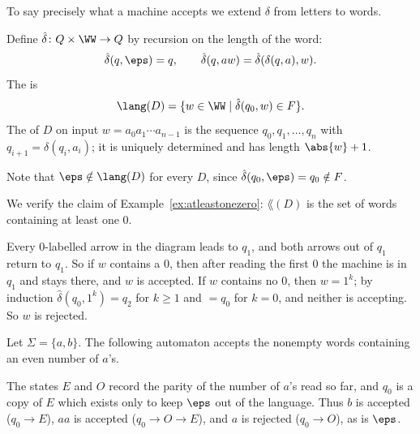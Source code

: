 To say precisely what a machine accepts we extend $\delta$ from letters to words.

\begin{definition}
	Define $\hat\delta \colon Q \times \WW \to Q$ by recursion on the length of the word:
	$$\hat\delta(q, \eps) = q, \qquad \hat\delta(q, aw) = \hat\delta(\delta(q,a), w).$$
	The  is
	$$\lang(D) = \{w \in \WW \mid \hat\delta(q_0, w) \in F\}.$$
	The  of $D$ on input $w = a_0a_1\cdots a_{n-1}$ is the sequence $q_0, q_1, \dots, q_n$ with $q_{i+1} = \delta(q_i, a_i)$; it is uniquely determined and has length $\abs{w} + 1$.
\end{definition}

Note that $\eps \notin \lang(D)$ for every $D$, since $\hat\delta(q_0, \eps) = q_0 \notin F$.

\begin{example}
	We verify the claim of Example~\ref{ex:atleastonezero}: $\lang(D)$ is the set of words containing at least one $0$.

	Every $0$-labelled arrow in the diagram leads to $q_1$, and both arrows out of $q_1$ return to $q_1$. So if $w$ contains a $0$, then after reading the first $0$ the machine is in $q_1$ and stays there, and $w$ is accepted. If $w$ contains no $0$, then $w = 1^k$; by induction $\hat\delta(q_0, 1^k) = q_2$ for $k \geq 1$ and $= q_0$ for $k = 0$, and neither is accepting. So $w$ is rejected.
\end{example}

\begin{example}\label{ex:evenas}
	Let $\Sigma = \{a,b\}$. The following automaton accepts the nonempty words containing an even number of $a$'s.
	\begin{center}
	\end{center}
	The states $E$ and $O$ record the parity of the number of $a$'s read so far, and $q_0$ is a copy of $E$ which exists only to keep $\eps$ out of the language. Thus $b$ is accepted ($q_0 \to E$), $aa$ is accepted ($q_0 \to O \to E$), and $a$ is rejected ($q_0 \to O$), as is $\eps$.
\end{example}

